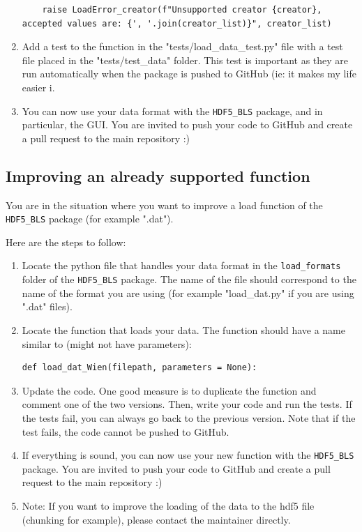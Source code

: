 \documentclass[a4paper,12pt]{article}
\begin{document}
\begin{enumerate}
\begin{lstlisting}
    raise LoadError_creator(f"Unsupported creator {creator}, accepted values are: {', '.join(creator_list)}", creator_list)
\end{lstlisting}
            \item Add a test to the function in the "tests/load\_data\_test.py" file with a test file placed in the "tests/test\_data" folder. This test is important as they are run automatically when the package is pushed to GitHub (ie: it makes my life easier ^^). 
            \item You can now use your data format with the \texttt{HDF5\_BLS} package, and in particular, the GUI. You are invited to push your code to GitHub and create a pull request to the main repository :)
        \end{enumerate}

    \subsection{Improving an already supported function} \label{subsec:load_data.improvement}
        \begin{tcolorbox}
            You are in the situation where you want to improve a load function of the \texttt{HDF5\_BLS} package (for example ".dat").
        \end{tcolorbox}

        Here are the steps to follow:
        \begin{enumerate}
            \item Locate the python file that handles your data format in the \texttt{load\_formats} folder of the \texttt{HDF5\_BLS} package. The name of the file should correspond to the name of the format you are using (for example "load\_dat.py" if you are using ".dat" files).
            \item Locate the function that loads your data. The function should have a name similar to (might not have parameters):
\begin{lstlisting}
def load_dat_Wien(filepath, parameters = None):
\end{lstlisting}
            \item Update the code. One good measure is to duplicate the function and comment one of the two versions. Then, write your code and run the tests. If the tests fail, you can always go back to the previous version. Note that if the test fails, the code cannot be pushed to GitHub.
            \item If everything is sound, you can now use your new function with the \texttt{HDF5\_BLS} package. You are invited to push your code to GitHub and create a pull request to the main repository :)
            \item Note: If you want to improve the loading of the data to the hdf5 file (chunking for example), please contact the maintainer directly.
        \end{enumerate}
\end{document}
